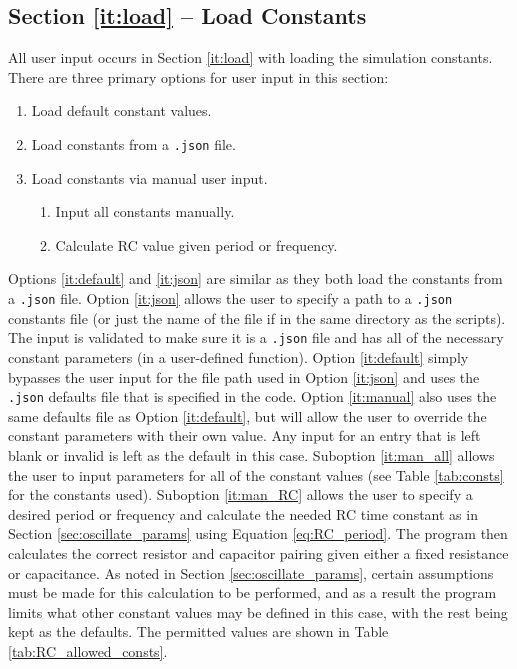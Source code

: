 \documentclass[12pt]{article}
\begin{document}
\subsection{Section \ref{it:load} -- Load Constants} \label{sec:load}
All user input occurs in Section \ref{it:load} with loading the simulation constants. There are three primary options for user input in this section:
\begin{enumerate}
    \item \label{it:default} Load default constant values.
    \item \label{it:json} Load constants from a \texttt{.json} file.
    \item \label{it:manual} Load constants via manual user input.
    \begin{enumerate}
        \item \label{it:man_all} Input all constants manually.
        \item \label{it:man_RC} Calculate RC value given period or frequency.
    \end{enumerate}
\end{enumerate}
Options \ref{it:default} and \ref{it:json} are similar as they both load the constants from a \texttt{.json} file. Option \ref{it:json} allows the user to specify a path to a \texttt{.json} constants file (or just the name of the file if in the same directory as the scripts). The input is validated to make sure it is a \texttt{.json} file and has all of the necessary constant parameters (in a user-defined function). Option \ref{it:default} simply bypasses the user input for the file path used in Option \ref{it:json} and uses the \texttt{.json} defaults file that is specified in the code. Option \ref{it:manual} also uses the same defaults file as Option \ref{it:default}, but will allow the user to override the constant parameters with their own value. Any input for an entry that is left blank or invalid is left as the default in this case. Suboption \ref{it:man_all} allows the user to input parameters for all of the constant values (see Table \ref{tab:consts} for the constants used). Suboption \ref{it:man_RC} allows the user to specify a desired period or frequency and calculate the needed RC time constant as in Section \ref{sec:oscillate_params} using Equation \ref{eq:RC_period}. The program then calculates the correct resistor and capacitor pairing given either a fixed resistance or capacitance. As noted in Section \ref{sec:oscillate_params}, certain assumptions must be made for this calculation to be performed, and as a result the program limits what other constant values may be defined in this case, with the rest being kept as the defaults. The permitted values are shown in Table \ref{tab:RC_allowed_consts}.
\end{document}
